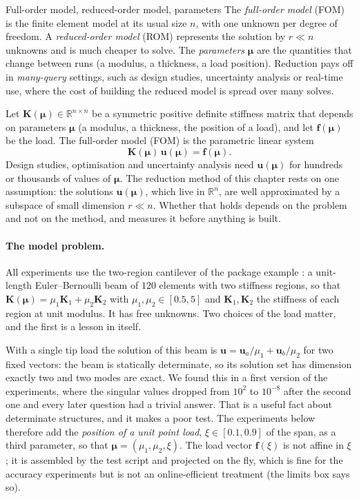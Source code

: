 \begin{sidenote}{Full-order model, reduced-order model, parameters}
The \emph{full-order model} (FOM) is the finite element model at its usual size $n$, with one unknown per degree of freedom. A \emph{reduced-order model} (ROM) represents the solution by $r\ll n$ unknowns and is much cheaper to solve. The \emph{parameters} $\bm\mu$ are the quantities that change between runs (a modulus, a thickness, a load position). Reduction pays off in \emph{many-query} settings, such as design studies, uncertainty analysis or real-time use, where the cost of building the reduced model is spread over many solves.
\end{sidenote}

Let $\bm K(\bm\mu)\in\mathbb R^{n\times n}$ be a symmetric positive definite stiffness matrix that depends on parameters $\bm\mu$ (a modulus, a thickness, the position of a load), and let $\bm f(\bm\mu)$ be the load. The full-order model (FOM) is the parametric linear system
\begin{equation}\label{eq:pod-fom}
\bm K(\bm\mu)\,\bm u(\bm\mu)=\bm f(\bm\mu).
\end{equation}
Design studies, optimisation and uncertainty analysis need $\bm u(\bm\mu)$ for hundreds or thousands of values of $\bm\mu$. The reduction method of this chapter rests on one assumption: the solutions $\bm u(\bm\mu)$, which live in $\mathbb R^n$, are well approximated by a subspace of small dimension $r\ll n$. Whether that holds depends on the problem and not on the method, and  measures it before anything is built.

\paragraph{The model problem.}
All experiments use the two-region cantilever of the package example : a unit-length Euler--Bernoulli beam of $120$ elements with two stiffness regions, so that $\bm K(\bm\mu)=\mu_1\bm K_1+\mu_2\bm K_2$ with $\mu_1,\mu_2\in[0.5,5]$ and $\bm K_1,\bm K_2$ the stiffness of each region at unit modulus. It has \cpdNFree free unknowns. Two choices of the load matter, and the first is a lesson in itself.

With a single tip load the solution of this beam is $\bm u=\bm u_a/\mu_1+\bm u_b/\mu_2$ for two fixed vectors: the beam is statically determinate, so its solution set has dimension exactly two and two modes are exact. We found this in a first version of the experiments, where the singular values dropped from $10^{2}$ to $10^{-8}$ after the second one and every later question had a trivial answer. That is a useful fact about determinate structures, and it makes a poor test. The experiments below therefore add the \emph{position of a unit point load}, $\xi\in[0.1,0.9]$ of the span, as a third parameter, so that $\bm\mu=(\mu_1,\mu_2,\xi)$. The load vector $\bm f(\xi)$ is not affine in $\xi$; it is assembled by the test script and projected on the fly, which is fine for the accuracy experiments but is not an online-efficient treatment (the limits box says so).

